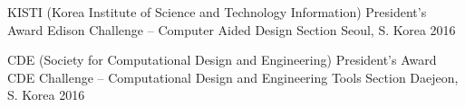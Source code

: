 

\begin{cvhonors}


\cvhonor
{KISTI (Korea Institute of Science and Technology Information) President’s Award} %
{Edison Challenge –  Computer Aided Design Section} %
{Seoul, S. Korea} %
{2016} %


\cvhonor
{CDE (Society for Computational Design and Engineering) President’s Award} %
{CDE Challenge – Computational Design and Engineering Tools Section} %
{Daejeon, S. Korea} %
{2016} %


\end{cvhonors}